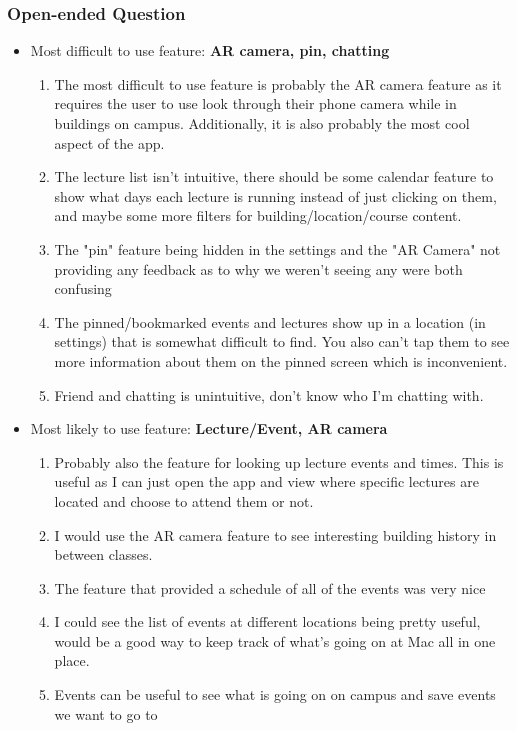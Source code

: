 \documentclass[12pt, titlepage]{article}
\begin{document}
\subsubsection{Open-ended Question}
\begin{itemize}
\item Most difficult to use feature: \textbf{AR camera, pin, chatting}
\begin{enumerate}
\item The most difficult to use feature is probably the AR camera feature as it requires the user to use look through their phone camera while in buildings on campus. Additionally, it is also probably the most cool aspect of the app.
\item The lecture list isn't intuitive, there should be some calendar feature to show what days each lecture is running instead of just clicking on them, and maybe some more filters for building/location/course content.
\item The "pin" feature being hidden in the settings and the "AR Camera" not providing any feedback as to why we weren't seeing any were both confusing
\item The pinned/bookmarked events and lectures show up in a location (in settings) that is somewhat difficult to find. You also can't tap them to see more information about them on the pinned screen which is inconvenient.
\item Friend and chatting is unintuitive, don't know who I'm chatting with.
\end{enumerate}
\item Most likely to use feature: \textbf{Lecture/Event, AR camera}
\begin{enumerate}
\item Probably also the feature for looking up lecture events and times. This is useful as I can just open the app and view where specific lectures are located and choose to attend them or not.
\item I would use the AR camera feature to see interesting building history in between classes.
\item The feature that provided a schedule of all of the events was very nice
\item I could see the list of events at different locations being pretty useful, would be a good way to keep track of what's going on at Mac all in one place.
\item Events can be useful to see what is going on on campus and save events we want to go to
\end{enumerate}
\end{itemize}
\end{document}
